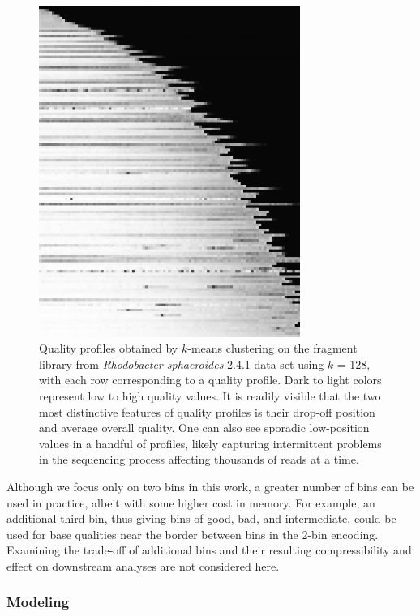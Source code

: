 \documentclass{bioinfo}
\begin{document}
\begin{methods}
\begin{figure}[!tpb]
\centerline{\includegraphics[width=3.35in]{profiles_128.png}}
\caption{Quality profiles obtained by $k$-means clustering on the
  fragment library from \textit{Rhodobacter sphaeroides} 2.4.1 data
  set using $k$ = 128, with each row corresponding to a quality
  profile. Dark to light colors represent low to high quality
  values. It is readily visible that the two most distinctive features
  of quality profiles is their drop-off position and average overall
  quality. One can also see sporadic low-position values in a handful
  of profiles, likely capturing intermittent problems in the
  sequencing process affecting thousands of reads at a
  time.}\label{fig:profiles_128}
\end{figure}

Although we focus only on two bins in this work, a greater number of
bins can be used in practice, albeit with some higher cost in memory.
For example, an additional third bin, thus giving bins of good, bad,
and intermediate, could be used for base qualities near the border
between bins in the 2-bin encoding. Examining the trade-off of
additional bins and their resulting compressibility and effect on
downstream analyses are not considered here.

\subsubsection{Modeling}


\end{methods}
\end{document}
